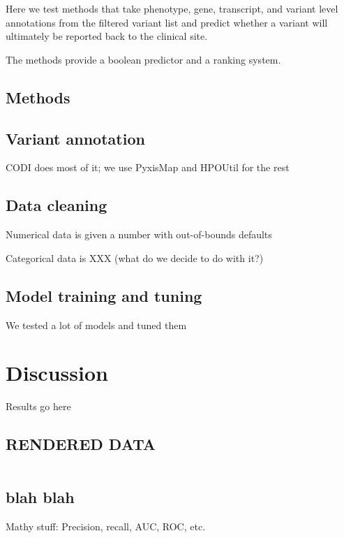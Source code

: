 \documentclass{bioinfo}
\begin{document}
Here we test methods that take phenotype, gene, transcript, and variant level annotations from the filtered variant list and predict whether a variant will ultimately be reported back to the clinical site.

The methods provide a boolean predictor and a ranking system.

\begin{methods}
\section{Methods}

\subsection{Variant annotation}
CODI does most of it; we use PyxisMap and HPOUtil for the rest

\subsection{Data cleaning}
Numerical data is given a number with out-of-bounds defaults

Categorical data is XXX (what do we decide to do with it?)

\subsection{Model training and tuning}

We tested a lot of models and tuned them

\end{methods}

\section{Discussion}
Results go here

\subsection{RENDERED DATA}
\begin{table*}
\centering
\begin{tabular}{c|c|c|c|c}

\end{tabular}
\end{table*}

\subsection{blah blah}
Mathy stuff: Precision, recall, AUC, ROC, etc.
\end{document}
